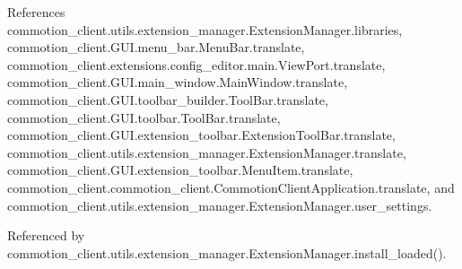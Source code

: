 References commotion\+\_\+client.\+utils.\+extension\+\_\+manager.\+Extension\+Manager.\+libraries, commotion\+\_\+client.\+G\+U\+I.\+menu\+\_\+bar.\+Menu\+Bar.\+translate, commotion\+\_\+client.\+extensions.\+config\+\_\+editor.\+main.\+View\+Port.\+translate, commotion\+\_\+client.\+G\+U\+I.\+main\+\_\+window.\+Main\+Window.\+translate, commotion\+\_\+client.\+G\+U\+I.\+toolbar\+\_\+builder.\+Tool\+Bar.\+translate, commotion\+\_\+client.\+G\+U\+I.\+toolbar.\+Tool\+Bar.\+translate, commotion\+\_\+client.\+G\+U\+I.\+extension\+\_\+toolbar.\+Extension\+Tool\+Bar.\+translate, commotion\+\_\+client.\+utils.\+extension\+\_\+manager.\+Extension\+Manager.\+translate, commotion\+\_\+client.\+G\+U\+I.\+extension\+\_\+toolbar.\+Menu\+Item.\+translate, commotion\+\_\+client.\+commotion\+\_\+client.\+Commotion\+Client\+Application.\+translate, and commotion\+\_\+client.\+utils.\+extension\+\_\+manager.\+Extension\+Manager.\+user\+\_\+settings.



Referenced by commotion\+\_\+client.\+utils.\+extension\+\_\+manager.\+Extension\+Manager.\+install\+\_\+loaded().


